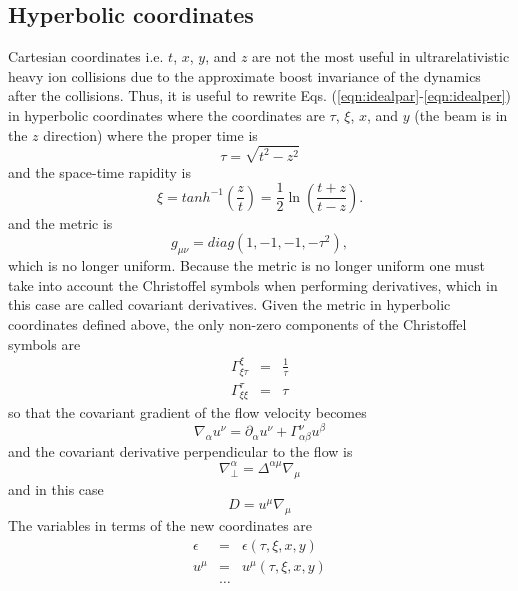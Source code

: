 \documentclass[aps,article]{revtex4}
\begin{document}
\subsection{Hyperbolic coordinates}

Cartesian coordinates i.e. $t$, $x$, $y$, and $z$ are not the most useful in ultrarelativistic heavy ion collisions due to the approximate boost invariance of the dynamics after the collisions.  Thus, it is useful to rewrite Eqs. (\ref{eqn:idealpar}-\ref{eqn:idealper}) in hyperbolic coordinates where the coordinates are $\tau$, $\xi$, $x$, and $y$ (the beam is in the $z$ direction) where the proper time is
\begin{equation}
\tau=\sqrt{t^2-z^2}
\end{equation}
and the space-time rapidity is
\begin{equation}
\xi=tanh^{-1} \left(\frac{z}{t}\right)=\frac{1}{2}\ln\left(\frac{t+z}{t-z}\right).
\end{equation}
and the metric is
\begin{equation}
g_{\mu\nu}=diag\left(1,-1,-1,-\tau^2\right),
\end{equation}
which is no longer uniform.  Because the metric is no longer uniform one must take into account the Christoffel symbols when performing derivatives, which in this case are called covariant derivatives. Given the metric in hyperbolic coordinates defined above, the only non-zero components of the Christoffel symbols are
\begin{eqnarray}
\Gamma^{\xi}_{\xi\tau}&=&\frac{1}{\tau}\nonumber\\
\Gamma^{\tau}_{\xi\xi}&=&\tau
\end{eqnarray}
so that the covariant gradient of the flow velocity becomes
\begin{equation}\label{eqn:covardev}
\nabla_{\alpha}u^{\nu}=\partial_{\alpha}u^{\nu}+\Gamma^{\nu}_{\alpha\beta}u^{\beta}
\end{equation}
and the covariant derivative perpendicular to the flow is
\begin{equation}
\nabla^{\alpha}_{\perp}=\Delta^{\alpha\mu}\nabla_{\mu}
\end{equation}
and in this case
\begin{equation}\label{eqn:dhyper}
D=u^{\mu}\nabla_{\mu}
\end{equation}
The variables in terms of the new coordinates are
\begin{eqnarray}\label{eqn:othershyper}
\epsilon&=&\epsilon\left(\tau,\xi,x,y\right)\nonumber\\
u^{\mu}&=&u^{\mu}\left(\tau,\xi,x,y\right)\nonumber\\
&\dots&
\end{eqnarray}
\end{document}
